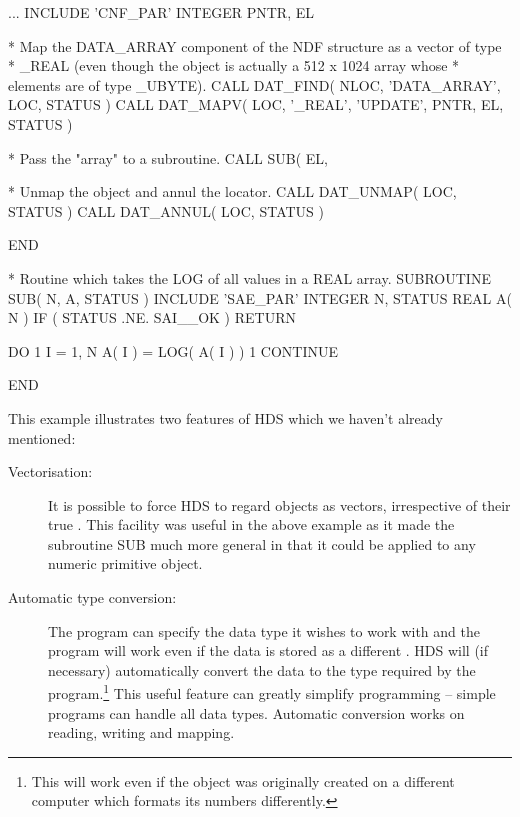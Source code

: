 \documentclass[twoside,11pt]{starlink}
\begin{document}
\begin{small}
\label{example:mapping}
\begin{terminalv}
      ...
      INCLUDE 'CNF_PAR'
      INTEGER PNTR, EL

*  Map the DATA_ARRAY component of the NDF structure as a vector of type
*  _REAL (even though the object is actually a 512 x 1024 array whose
*  elements are of type _UBYTE).
      CALL DAT_FIND( NLOC, 'DATA_ARRAY', LOC, STATUS )
      CALL DAT_MAPV( LOC, '_REAL', 'UPDATE', PNTR, EL, STATUS )

*  Pass the "array" to a subroutine.
      CALL SUB( EL, %

*  Unmap the object and annul the locator.
      CALL DAT_UNMAP( LOC, STATUS )
      CALL DAT_ANNUL( LOC, STATUS )

      END

*  Routine which takes the LOG of all values in a REAL array.
      SUBROUTINE SUB( N, A, STATUS )
      INCLUDE 'SAE_PAR'
      INTEGER N, STATUS
      REAL A( N )
      IF ( STATUS .NE. SAI__OK ) RETURN

      DO 1 I = 1, N
         A( I ) = LOG( A( I ) )
 1    CONTINUE

      END
\end{terminalv}
\end{small}

This example illustrates two features of HDS which we haven't already
mentioned:

\begin{description}

\item [Vectorisation:]
It is possible to force HDS to regard objects as vectors, irrespective
of their true . This facility was useful in
the above example as it made the subroutine SUB much more general in
that it could be applied to any numeric primitive object.

\item [\label{sect:typeconversion}Automatic type conversion:]
The program can specify the data type it wishes to work with and the
program will work even if the data is stored as a different
. HDS will (if necessary) automatically
convert the data to the type required by the program.\footnote{This
will work even if the object was originally created on a different
computer which formats its numbers differently.} This useful feature
can greatly simplify programming -- simple programs can handle all
data types.  Automatic conversion works on reading, writing and
mapping.

\end{description}
\end{document}
